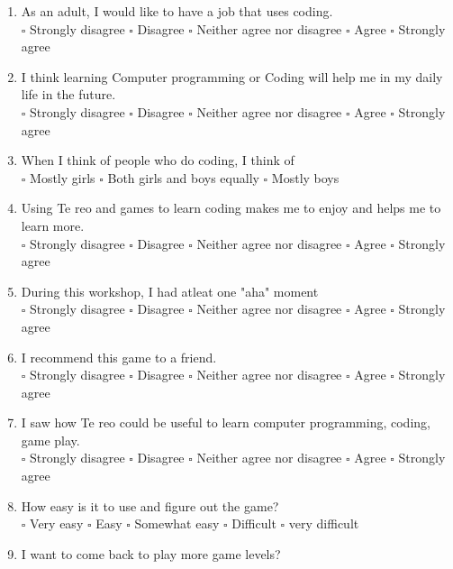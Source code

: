 \documentclass[12pt]{article}\pagestyle{myheadings}
\theoremstyle{plain}
\begin{document}
\begin{enumerate}
\item As an adult, I would like to have a job that uses coding. \\ 
$\square$ Strongly disagree $\square$ Disagree $\square$ Neither agree nor disagree $\square$ Agree $\square$ Strongly agree


\item I think learning Computer programming or Coding will help me in my daily life in the future.\\
$\square$ Strongly disagree $\square$ Disagree $\square$ Neither agree nor disagree $\square$ Agree $\square$ Strongly agree



\item When I think of people who do coding, I think of \\
$\square$ Mostly girls $\square$ Both girls and boys equally $\square$ Mostly boys


\item Using Te reo and games to learn coding makes me to enjoy and helps me to learn more. \\
$\square$ Strongly disagree $\square$ Disagree $\square$ Neither agree nor disagree $\square$ Agree $\square$ Strongly agree

\item During this workshop, I had atleat one "aha" moment \\
$\square$ Strongly disagree $\square$ Disagree $\square$ Neither agree nor disagree $\square$ Agree $\square$ Strongly agree

\item I recommend this game to a friend. \\
$\square$ Strongly disagree $\square$ Disagree $\square$ Neither agree nor disagree $\square$ Agree $\square$ Strongly agree


\item I saw how Te reo could be useful to learn computer programming, coding, game play. \\
$\square$ Strongly disagree $\square$ Disagree $\square$ Neither agree nor disagree $\square$ Agree $\square$ Strongly agree


\item  How easy is it to use and figure out the game?\\
$\square$ Very easy $\square$ Easy $\square$ Somewhat easy $\square$ Difficult $\square$ very difficult


\item I want to come back to play more game levels?\\ 


\end{enumerate}
\end{document}

